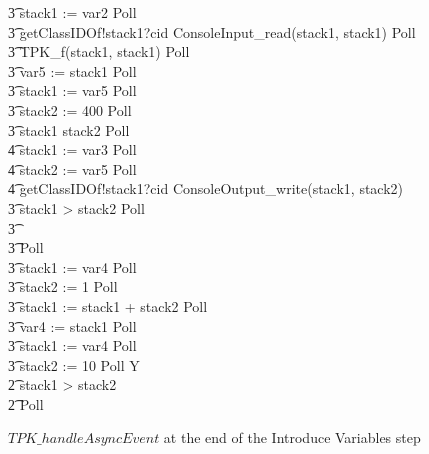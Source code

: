 \begin{figure}[tp!]
\begin{circusaction}
    \t3 stack1 := var2 \circseq Poll \circseq \\
    \t3 getClassIDOf!stack1?cid \then ConsoleInput\_read(stack1, stack1) \circseq Poll \circseq \\
    \t3 TPK\_f(stack1, stack1) \circseq Poll \circseq \\
    \t3 var5 := stack1 \circseq Poll \circseq \\
    \t3 stack1 := var5 \circseq Poll \circseq \\
    \t3 stack2 := 400 \circseq Poll \circseq \\
    \t3 \circif stack1 \leq stack2 \circthen Poll \circseq \\
    \t4 stack1 := var3 \circseq Poll \circseq \\
    \t4 stack2 := var5 \circseq Poll \circseq \\
    \t4 getClassIDOf!stack1?cid \then ConsoleOutput\_write(stack1, stack2) \\
    \t3 {} \circelse stack1 > stack2 \circthen Poll \circseq \\
    \t3 {} \cdots {} \\
    \t3 \circfi \circseq Poll \circseq \\
    \t3 stack1 := var4 \circseq Poll \circseq \\
    \t3 stack2 := 1 \circseq Poll \circseq \\
    \t3 stack1 := stack1 + stack2 \circseq Poll \circseq \\
    \t3 var4 := stack1 \circseq Poll \\
    \t3 stack1 := var4 \circseq Poll \circseq \\
    \t3 stack2 := 10 \circseq Poll \circseq Y \\
    \t2 {} \circelse stack1 > stack2 \circthen \Skip \\
    \t2 \circfi \circseq Poll
  \end{circusaction}
  \caption{$TPK\_handleAsyncEvent$ at the end of the Introduce
    Variables step}
  \label{efs-introduce-variables-example-figure}
\end{figure}

